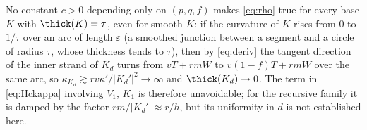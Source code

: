 \begin{remark}\label{rem:Hcfalse}
No constant $c>0$ depending only on $(p,q,f)$ makes \eqref{eq:rho} true for every base $K$ with $\thick(K)=\tau$,
even for smooth $K$: if the curvature of $K$ rises from $0$ to $1/\tau$ over an arc of length $\varepsilon$ (a
smoothed junction between a segment and a circle of radius $\tau$, whose thickness tends to $\tau$), then by
\eqref{eq:deriv} the tangent direction of the inner strand of $K_d$ turns from $vT+rmW$ to $v(1-f)T+rmW$ over the same
arc, so $\kappa_{K_d}\gtrsim rv\kappa'/|K_d'|^2\to\infty$ and $\thick(K_d)\to0$. The term in \eqref{eq:Hckappa}
involving $V_1$, $K_1$ is therefore unavoidable; for the recursive family it is damped by the factor
$rm/|K_d'|\approx r/h$, but its uniformity in $d$ is not established here.
\end{remark}
